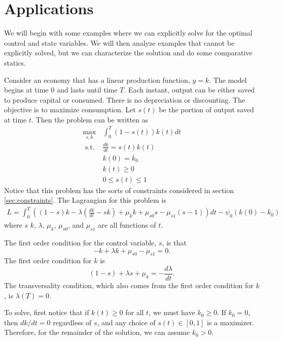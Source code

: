 
\section{Applications}

We will begin with some examples where we can explicitly solve for the
optimal control and state variables. We will then analyze examples
that cannot be explicitly solved, but we can characterize the
solution and do some comparative statics. 

\begin{example}
  Consider an economy that has a linear production function, $y =
  k$. The model begins at time $0$ and lasts until time $T$. Each
  instant, output can be either saved to produce capital or
  consumed. There is no depreciation or discounting. The objective is
  to maximize consumption. Let $s(t)$ be the portion of output saved
  at time $t$. Then the problem can be written as
  \begin{align*}
    \max_{s,k} & \int_0^T (1-s(t)) k(t) dt \\
    \text{ s.t. } & \frac{dk}{dt} = s(t)k(t) \\
    & k(0) = k_0 \\
    & k(t) \geq 0 \\
    & 0 \leq s(t) \leq 1
  \end{align*}
  Notice that this problem has the sorts of constraints considered in
  section \ref{sec:constraints}. 
  The Lagrangian for this problem is
  \begin{align*}
    L = \int_0^T \left((1-s)k -\lambda (\frac{dk}{dt} - sk) + \mu_kk
      +\mu_{s0}s - \mu_{s1}(s-1) \right) dt - \psi_0(k(0) - k_0)
  \end{align*}
  where $s$ $k$, $\lambda$, $\mu_{k}$, $\mu_{s0}$, and $\mu_{s1}$ are
  all functions of $t$. 
  
  The first order condition for the control variable, $s$, is that
  \[ -k + \lambda k + \mu_{s0} - \mu_{s1} = 0. \]
  The first order condition for $k$ is
  \[ (1-s) + \lambda s + \mu_k = -\frac{d\lambda}{dt}. \] The
  transversality condition, which also comes from the first order
  condition for $k$, is $\lambda(T) = 0$.  

  To solve, first notice that if $k(t) \geq 0$ for all $t$, we must
  have $k_0 \geq 0$. If $k_0 = 0$, then $dk/dt = 0$ regardless of $s$,
  and any choice of $s(t) \in [0,1]$ is a maximizer. Therefore, for
  the remainder of the solution, we can assume $k_0 > 0$. 
  

\end{example}
